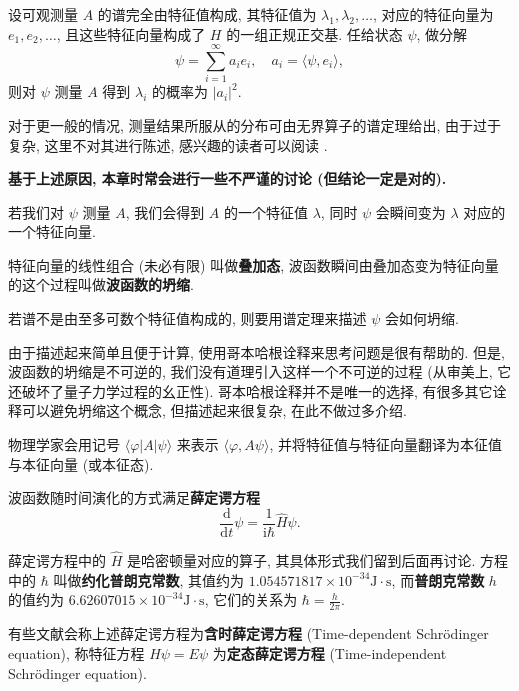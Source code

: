 设可观测量 $ A $ 的谱完全由特征值构成, 其特征值为 $ \lambda_1,\lambda_2,\dots $, 对应的特征向量为 $ e_1,e_2,\dots $, 且这些特征向量构成了 $ H $ 的一组正规正交基. 任给状态 $ \psi $, 做分解
\[ \psi=\sum_{i=1}^{\infty}a_ie_i,\quad a_i=\langle \psi,e_i \rangle, \]
则对 $ \psi $ 测量 $ A $ 得到 $ \lambda_i $ 的概率为 $ |a_i|^2 $.

对于更一般的情况, 测量结果所服从的分布可由无界算子的谱定理给出, 由于过于复杂, 这里不对其进行陈述, 感兴趣的读者可以阅读 \cite[第 10 章]{hall2013quantum}.

\textbf{基于上述原因, 本章时常会进行一些不严谨的讨论 (但结论一定是对的).}

\begin{definition}[哥本哈根诠释]
    若我们对 $ \psi $ 测量 $ A $, 我们会得到 $ A $ 的一个特征值 $ \lambda $, 同时 $ \psi $ 会瞬间变为 $ \lambda $ 对应的一个特征向量. 
\end{definition}

特征向量的线性组合 (未必有限) 叫做{\bf 叠加态}, 波函数瞬间由叠加态变为特征向量的这个过程叫做{\bf 波函数的坍缩}. 
\begin{remark}
    若谱不是由至多可数个特征值构成的, 则要用谱定理来描述 $ \psi $ 会如何坍缩.
\end{remark}

由于描述起来简单且便于计算, 使用哥本哈根诠释来思考问题是很有帮助的. 但是, 波函数的坍缩是不可逆的, 我们没有道理引入这样一个不可逆的过程 (从审美上, 它还破坏了量子力学过程的幺正性). 哥本哈根诠释并不是唯一的选择, 有很多其它诠释可以避免坍缩这个概念, 但描述起来很复杂, 在此不做过多介绍.

物理学家会用记号 $ \langle\varphi|A|\psi\rangle $ 来表示 $ \langle\varphi, A\psi\rangle $, 并将特征值与特征向量翻译为本征值与本征向量 (或本征态).

\begin{quantumaxiom}[薛定谔方程] 波函数随时间演化的方式满足{\bf 薛定谔方程}
    \[ \frac{\mathrm{d}}{\mathrm{d}t}\psi=\frac{1}{\mathrm{i}\hbar}\hat{H}\psi. \]
\end{quantumaxiom}

薛定谔方程中的 $ \hat H $ 是哈密顿量对应的算子, 其具体形式我们留到后面再讨论. 方程中的 $ \hbar $ 叫做{\bf 约化普朗克常数}, 其值约为 $ 1.054571817\times 10^{-34} \mathrm{J\cdot s} $, 而{\bf 普朗克常数} $ h $ 的值约为 $ 6.62607015\times 10^{-34}\mathrm{J}\cdot \mathrm{s} $, 它们的关系为 $ \hbar=\frac{h}{2\pi} $.

有些文献会称上述薛定谔方程为{\bf 含时薛定谔方程} (Time-dependent Schr\"{o}dinger equation), 称特征方程 $ \hat H\psi=E\psi $ 为{\bf 定态薛定谔方程} (Time-independent Schr\"{o}dinger equation).